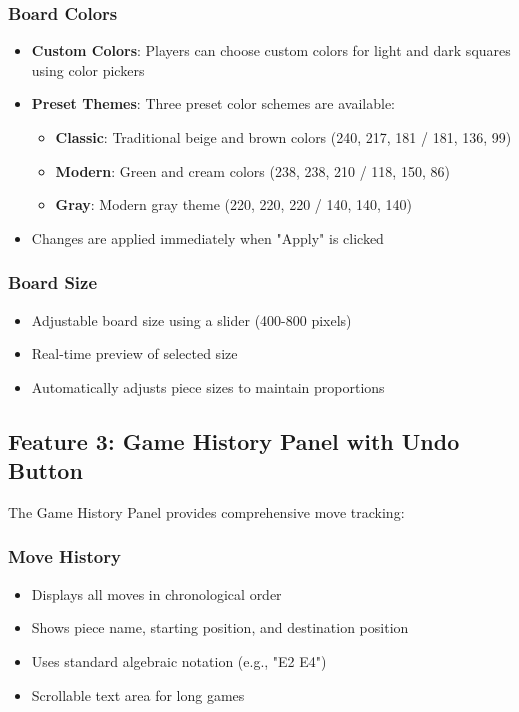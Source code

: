 \documentclass[12pt]{article}
\begin{document}
\subsubsection{Board Colors}
\begin{itemize}
    \item \textbf{Custom Colors}: Players can choose custom colors for light and dark squares using color pickers
    \item \textbf{Preset Themes}: Three preset color schemes are available:
    \begin{itemize}
        \item \textbf{Classic}: Traditional beige and brown colors (240, 217, 181 / 181, 136, 99)
        \item \textbf{Modern}: Green and cream colors (238, 238, 210 / 118, 150, 86)
        \item \textbf{Gray}: Modern gray theme (220, 220, 220 / 140, 140, 140)
    \end{itemize}
    \item Changes are applied immediately when "Apply" is clicked
\end{itemize}

\subsubsection{Board Size}
\begin{itemize}
    \item Adjustable board size using a slider (400-800 pixels)
    \item Real-time preview of selected size
    \item Automatically adjusts piece sizes to maintain proportions
\end{itemize}

\subsection{Feature 3: Game History Panel with Undo Button}

The Game History Panel provides comprehensive move tracking:

\subsubsection{Move History}
\begin{itemize}
    \item Displays all moves in chronological order
    \item Shows piece name, starting position, and destination position
    \item Uses standard algebraic notation (e.g., "E2 E4")
    \item Scrollable text area for long games
\end{itemize}
\end{document}
